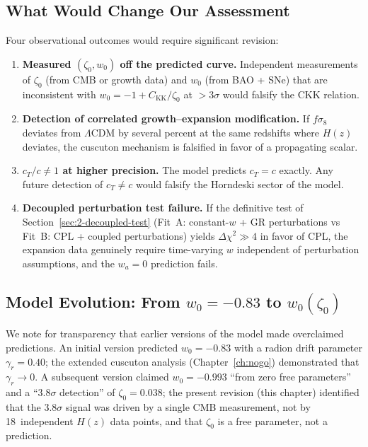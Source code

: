 \subsection{What Would Change Our Assessment}
\label{sec:2-change}

Four observational outcomes would require significant revision:
\begin{enumerate}
    \item \textbf{Measured $(\zeta_0, w_0)$ off the predicted curve.} Independent measurements of $\zeta_0$ (from CMB or growth data) and $w_0$ (from BAO + SNe) that are inconsistent with $w_0 = -1 + C_\mathrm{KK}/\zeta_0$ at $> 3\sigma$ would falsify the CKK relation.

    \item \textbf{Detection of correlated growth--expansion modification.} If $f\sigma_8$ deviates from $\Lambda$CDM by several percent at the same redshifts where $H(z)$ deviates, the cuscuton mechanism is falsified in favor of a propagating scalar.

    \item \textbf{$c_T/c \neq 1$ at higher precision.} The model predicts $c_T = c$ exactly. Any future detection of $c_T \neq c$ would falsify the Horndeski sector of the model.

    \item \textbf{Decoupled perturbation test failure.} If the definitive test of Section~\ref{sec:2-decoupled-test} (Fit~A: constant-$w$ + GR perturbations vs Fit~B: CPL + coupled perturbations) yields $\Delta\chi^2 \gg 4$ in favor of CPL, the expansion data genuinely require time-varying $w$ independent of perturbation assumptions, and the $w_a = 0$ prediction fails.
\end{enumerate}

\subsection{Model Evolution: From $w_0 = -0.83$ to $w_0(\zeta_0)$}
\label{sec:2-evolution}

We note for transparency that earlier versions of the model made overclaimed predictions. An initial version predicted $w_0 = -0.83$ with a radion drift parameter $\gamma_r = 0.40$; the extended cuscuton analysis (Chapter~\ref{ch:nogo}) demonstrated that $\gamma_r \to 0$. A subsequent version claimed $w_0 = -0.993$ ``from zero free parameters'' and a ``$3.8\sigma$ detection'' of $\zeta_0 = 0.038$; the present revision (this chapter) identified that the $3.8\sigma$ signal was driven by a single CMB measurement, not by 18~independent $H(z)$ data points, and that $\zeta_0$ is a free parameter, not a prediction.

